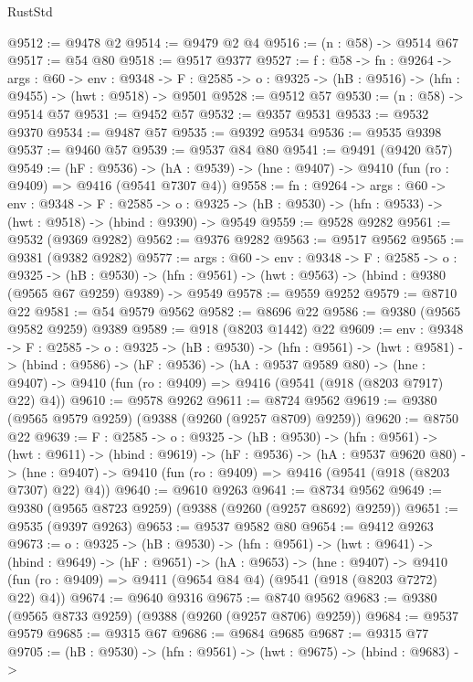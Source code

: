 \begin{lexlean}{RustStd}
\begin{coremodule}
@9512 := @9478 @2
@9514 := @9479 @2 @4
@9516 := (n : @58) -> @9514 @67
@9517 := @54 @80
@9518 := @9517 @9377
@9527 := {f : @58} ->
  {fn : @9264} ->
  {args : @60} ->
  {env : @9348} ->
  {F : @2585} -> {o : @9325} -> (hB : @9516) -> (hfn : @9455) -> (hwt : @9518) -> @9501
@9528 := @9512 @57
@9530 := (n : @58) -> @9514 @57
@9531 := @9452 @57
@9532 := @9357 @9531
@9533 := @9532 @9370
@9534 := @9487 @57
@9535 := @9392 @9534
@9536 := @9535 @9398
@9537 := @9460 @57
@9539 := @9537 @84 @80
@9541 := @9491 (@9420 @57)
@9549 := (hF : @9536) ->
  (hA : @9539) -> (hne : @9407) -> @9410 (fun (ro : @9409) => @9416 (@9541 @7307 @4))
@9558 := {fn : @9264} ->
  {args : @60} ->
  {env : @9348} ->
  {F : @2585} ->
  {o : @9325} -> (hB : @9530) -> (hfn : @9533) -> (hwt : @9518) -> (hbind : @9390) -> @9549
@9559 := @9528 @9282
@9561 := @9532 (@9369 @9282)
@9562 := @9376 @9282
@9563 := @9517 @9562
@9565 := @9381 (@9382 @9282)
@9577 := {args : @60} ->
  {env : @9348} ->
  {F : @2585} ->
  {o : @9325} ->
  (hB : @9530) -> (hfn : @9561) -> (hwt : @9563) -> (hbind : @9380 (@9565 @67 @9259) @9389) -> @9549
@9578 := @9559 @9252
@9579 := @8710 @22
@9581 := @54 @9579 @9562
@9582 := @8696 @22
@9586 := @9380 (@9565 @9582 @9259) @9389
@9589 := @918 (@8203 @1442) @22
@9609 := {env : @9348} ->
  {F : @2585} ->
  {o : @9325} ->
  (hB : @9530) ->
  (hfn : @9561) ->
  (hwt : @9581) ->
  (hbind : @9586) ->
  (hF : @9536) ->
  (hA : @9537 @9589 @80) ->
  (hne : @9407) -> @9410 (fun (ro : @9409) => @9416 (@9541 (@918 (@8203 @7917) @22) @4))
@9610 := @9578 @9262
@9611 := @8724 @9562
@9619 := @9380 (@9565 @9579 @9259) (@9388 (@9260 (@9257 @8709) @9259))
@9620 := @8750 @22
@9639 := {F : @2585} ->
  {o : @9325} ->
  (hB : @9530) ->
  (hfn : @9561) ->
  (hwt : @9611) ->
  (hbind : @9619) ->
  (hF : @9536) ->
  (hA : @9537 @9620 @80) ->
  (hne : @9407) -> @9410 (fun (ro : @9409) => @9416 (@9541 (@918 (@8203 @7307) @22) @4))
@9640 := @9610 @9263
@9641 := @8734 @9562
@9649 := @9380 (@9565 @8723 @9259) (@9388 (@9260 (@9257 @8692) @9259))
@9651 := @9535 (@9397 @9263)
@9653 := @9537 @9582 @80
@9654 := @9412 @9263
@9673 := {o : @9325} ->
  (hB : @9530) ->
  (hfn : @9561) ->
  (hwt : @9641) ->
  (hbind : @9649) ->
  (hF : @9651) ->
  (hA : @9653) ->
  (hne : @9407) ->
  @9410 (fun (ro : @9409) => @9411 (@9654 @84 @4) (@9541 (@918 (@8203 @7272) @22) @4))
@9674 := @9640 @9316
@9675 := @8740 @9562
@9683 := @9380 (@9565 @8733 @9259) (@9388 (@9260 (@9257 @8706) @9259))
@9684 := @9537 @9579
@9685 := @9315 @67
@9686 := @9684 @9685
@9687 := @9315 @77
@9705 := (hB : @9530) ->
  (hfn : @9561) ->
  (hwt : @9675) ->
  (hbind : @9683) ->

\end{coremodule}
\end{lexlean}
